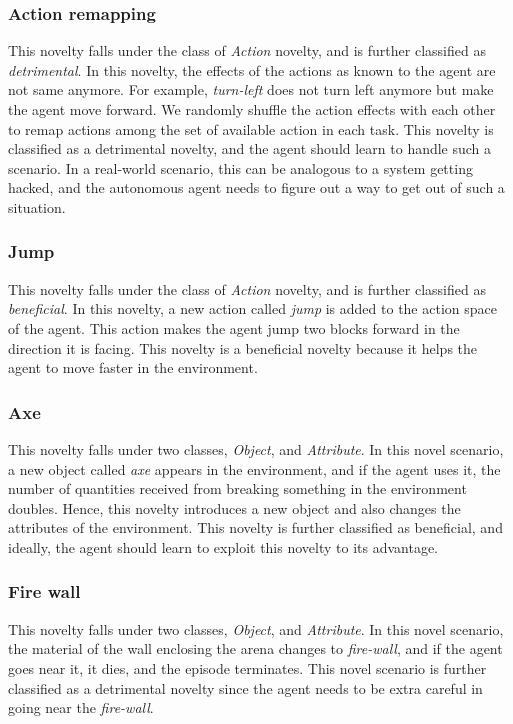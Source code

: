 \documentclass[sigconf]{aamas}
\begin{document}
\subsubsection{Action remapping}

This novelty falls under the class of \emph{Action} novelty, and is further classified as \emph{detrimental}. In this novelty, the effects of the actions as known to the agent are not same anymore. For example, \emph{turn-left} does not turn left anymore but make the agent move forward. We randomly shuffle the action effects with each other to remap actions among the set of available action in each task. This novelty is classified as a detrimental novelty, and the agent should learn to handle such a scenario. In a real-world scenario, this can be analogous to a system getting hacked, and the autonomous agent needs to figure out a way to get out of such a situation.

\subsubsection{Jump}

This novelty falls under the class of \emph{Action} novelty, and is further classified as \emph{beneficial}. In this novelty, a new action called \emph{jump} is added to the action space of the agent. This action makes the agent jump two blocks forward in the direction it is facing. This novelty is a beneficial novelty because it helps the agent to move faster in the environment. 

\subsubsection{Axe}

This novelty falls under two classes, \emph{Object}, and \emph{Attribute}. In this novel scenario, a new object called \emph{axe} appears in the environment, and if the agent uses it, the number of quantities received from breaking something in the environment doubles. Hence, this novelty introduces a new object and also changes the attributes of the environment. This novelty is further classified as beneficial, and ideally, the agent should learn to exploit this novelty to its advantage.

\subsubsection{Fire wall}

This novelty falls under two classes, \emph{Object}, and \emph{Attribute}. In this novel scenario, the material of the wall enclosing the arena changes to \emph{fire-wall}, and if the agent goes near it, it dies, and the episode terminates. This novel scenario is further classified as a detrimental novelty since the agent needs to be extra careful in going near the \emph{fire-wall}.
\end{document}
